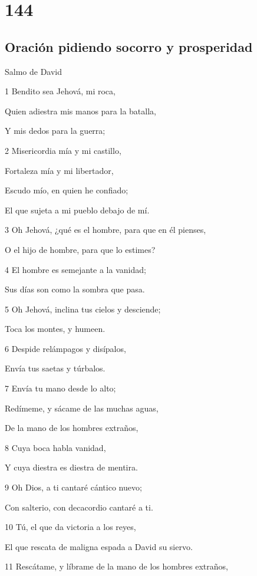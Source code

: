 \chapter{144}

\section*{Oración pidiendo socorro y prosperidad}

\par Salmo de David

\par 1 Bendito sea Jehová, mi roca,
\par Quien adiestra mis manos para la batalla,
\par Y mis dedos para la guerra;
\par 2 Misericordia mía y mi castillo,
\par Fortaleza mía y mi libertador,
\par Escudo mío, en quien he confiado;
\par El que sujeta a mi pueblo debajo de mí.
\par 3 Oh Jehová, ¿qué es el hombre, para que en él pienses,
\par O el hijo de hombre, para que lo estimes?
\par 4 El hombre es semejante a la vanidad;
\par Sus días son como la sombra que pasa.
\par 5 Oh Jehová, inclina tus cielos y desciende;
\par Toca los montes, y humeen.
\par 6 Despide relámpagos y disípalos,
\par Envía tus saetas y túrbalos.
\par 7 Envía tu mano desde lo alto;
\par Redímeme, y sácame de las muchas aguas,
\par De la mano de los hombres extraños,
\par 8 Cuya boca habla vanidad,
\par Y cuya diestra es diestra de mentira.
\par 9 Oh Dios, a ti cantaré cántico nuevo;
\par Con salterio, con decacordio cantaré a ti.
\par 10 Tú, el que da victoria a los reyes,
\par El que rescata de maligna espada a David su siervo.
\par 11 Rescátame, y líbrame de la mano de los hombres extraños,
